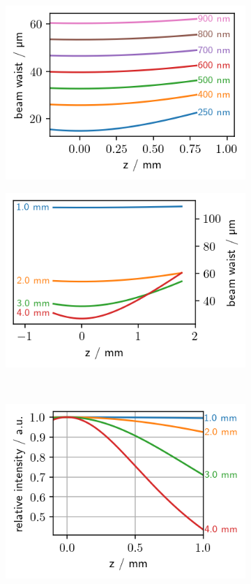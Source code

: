 \documentclass[twoside,openright,listof=numbered]{scrreprt}
\begin{document}
\begin{figure}[htbp]
\centering
\begin{subfigure}[t]{0.49\textwidth}
\centering
\includegraphics[scale=1]{images/BeamWaist_Wavs_2.5mm.png} 
\end{subfigure}
\hfill
\begin{subfigure}[t]{0.49\textwidth}
\centering
\includegraphics[scale=1]{images/BeamWaist_inputWidth_653nm.png} 
\end{subfigure}
\hfill
\\
\centering
\begin{subfigure}[t]{\textwidth}
\includegraphics[scale=1]{images/DOFintensity_inputWidth_653nm.png} 

\end{subfigure}
\end{figure}
\end{document}
